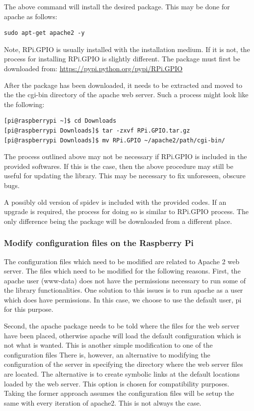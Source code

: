 \documentclass{article}	%
\begin{document}
\begin{multicols}{2}
The above command will install the desired package.
This may be done for apache as follows:

\begin{lstlisting}
sudo apt-get apache2 -y
\end{lstlisting}

Note, RPi.GPIO is usually installed with the installation
medium.
If it is not,
the process for installing RPi.GPIO is slightly different.
The package must first be downloaded from:
\url{https://pypi.python.org/pypi/RPi.GPIO}

After the package has been downloaded,
it needs to be extracted and moved to the
the cgi-bin directory of the apache web server.
Such a process might look like the following:

\begin{lstlisting}
[pi@raspberrypi ~]$ cd Downloads
[pi@raspberrypi Downloads]$ tar -zxvf RPi.GPIO.tar.gz
[pi@raspberrypi Downloads]$ mv RPi.GPIO ~/apache2/path/cgi-bin/
\end{lstlisting}

The process outlined above may not be necessary if
RPi.GPIO is included in the provided softwares.
If this is the case, then
the above procedure may still be useful for updating
the library.
This may be necessary to fix unforeseen, obscure bugs.

A possibly old version of spidev is included with the provided codes.
If an upgrade is required,
the process for doing so is similar to RPi.GPIO process.
The only difference being the package
will be downloaded from a different place.

\subsubsection{Modify configuration files on the Raspberry Pi}
The configuration files which need to be modified are
related to Apache 2 web server.
The files which need to be modified for the following reasons.
First, the apache user (www-data) does not have the permissions necessary
to run some of the library functionalities.
One solution to this issues is to run apache as 
a user which does have permissions.
In this case,
we choose to use the default user, pi for this purpose.

Second, the apache package needs to be told where
the files for the web server have been placed,
otherwise apache will load the default configuration
which is not what is wanted.
This is another simple modification to one of the configuration files
There is, however, an alternative to modifying the configuration of the server
in specifying the directory where the web server files are located.
The alternative is to create symbolic links at the default locations 
loaded by the web server.
This option is chosen for compatibility purposes.
Taking the former approach assumes the configuration files will
be setup the same with every iteration of apache2.
This is not always the case.


\end{multicols}
\end{document}
